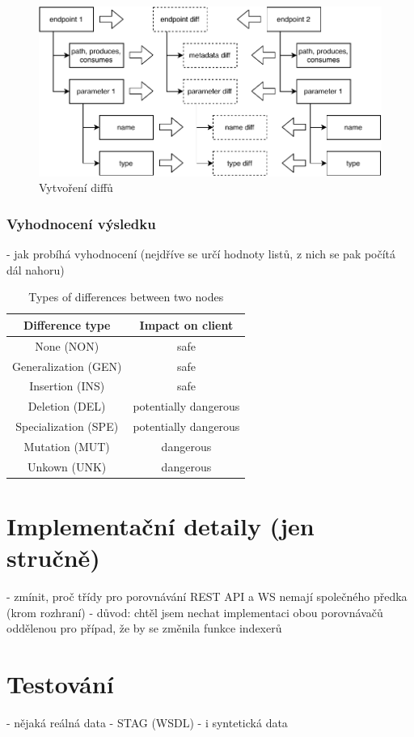 \documentclass[czech,DP]{thesiskiv}
\begin{document}
\begin{figure}[h]
	\centering
	\includegraphics{diff-construction}
	\caption{Vytvoření diffů}
	\label{fig:diff-construction}
\end{figure}

\subsection{Vyhodnocení výsledku}

- jak probíhá vyhodnocení (nejdříve se určí hodnoty listů, z nich se pak počítá dál nahoru)

\begin{table}[h!]
	\centering
	\begin{tabular}{c|c}
		Difference type & Impact on client  \\
		\hline
		None (NON) & safe \\
		Generalization (GEN) & safe  \\
		Insertion (INS) & safe \\
		Deletion (DEL) & potentially dangerous \\
		Specialization (SPE) & potentially dangerous \\
		Mutation (MUT) & dangerous \\
		Unkown (UNK) & dangerous
	\end{tabular}
	\caption{Types of differences between two nodes }
	\label{tab:diff-level}
\end{table}

\chapter{Implementační detaily (jen stručně)}

 - zmínit, proč třídy pro porovnávání REST API a WS nemají společného předka (krom rozhraní)
 	- důvod: chtěl jsem nechat implementaci obou porovnávačů oddělenou pro případ, že by se změnila funkce indexerů

\chapter{Testování}

- nějaká reálná data
	- STAG (WSDL)
- i syntetická data
 
% 
%

{\raggedright\small

}
\end{document}
